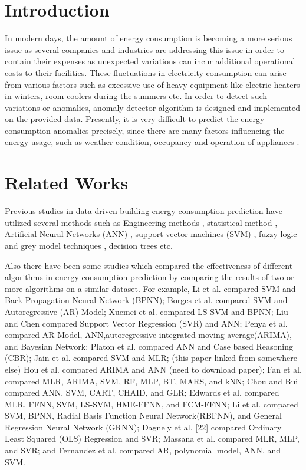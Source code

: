 \documentclass[conference]{IEEEtran}
\begin{document}
\section{Introduction}
In modern days, the amount of energy consumption is becoming a more serious issue as several companies and industries are addressing this issue in order to contain their expenses as unexpected variations can incur additional operational costs to their facilities. These fluctuations in electricity consumption can arise from various factors such as excessive use of heavy equipment like electric heaters in winters, room coolers during the summers etc. In order to detect such variations or anomalies, anomaly detector algorithm is designed and implemented on the provided data.
Presently, it is very difficult to predict the energy consumption anomalies precisely, since there are many factors influencing the energy usage, such as weather condition,  occupancy \cite{bb1} and operation of appliances \cite{bb2,bb3}. 

\section{Related Works}

Previous studies in data-driven building energy consumption prediction have utilized several methods such as Engineering methods \cite{bb4}, statistical method \cite{bb5}, Artificial Neural Networks (ANN) \cite{bb6,bb7}, support vector machines (SVM) \cite{bb8}, fuzzy logic and grey model techniques \cite{bb9}, decision trees \cite{bb10} etc. 

Also there have been some studies which compared the effectiveness of different algorithms in energy consumption prediction by comparing the results of two or more algorithms on a similar dataset. For example, Li et al. \cite{bb8} compared SVM and Back Propagation Neural Network (BPNN); Borges et al. \cite{bb11} compared SVM and Autoregressive (AR) Model; Xuemei et al. \cite{bb12}  compared LS-SVM and BPNN; Liu and Chen \cite{bb13}  compared Support Vector Regression (SVR) and ANN; Penya et al. \cite{bb14}  compared AR Model, ANN,autoregressive integrated moving average(ARIMA), and Bayesian Network; Platon et al. \cite{bb15}  compared ANN and Case based Reasoning (CBR); Jain et al. \cite{bb16} compared SVM and MLR; (this paper linked from somewhere else) Hou et al. \cite{bb17}  compared ARIMA and ANN (need to download paper);  Fan et al. \cite{bb18}  compared MLR, ARIMA, SVM, RF, MLP, BT, MARS, and kNN; Chou and Bui \cite{bb19}  compared ANN, SVM, CART, CHAID, and GLR; Edwards et al. \cite{bb20}  compared MLR, FFNN, SVM, LS-SVM, HME-FFNN, and FCM-FFNN; Li et al. \cite{bb21,bb22} compared SVM, BPNN, Radial Basis Function Neural Network(RBFNN), and General Regression Neural Network (GRNN); Dagnely et al. \cite{bb23} [22] compared Ordinary Least Squared (OLS) Regression and SVR; Massana et al. \cite{bb24} compared MLR, MLP, and SVR; and Fernandez et al. \cite{bb25}  compared AR, polynomial model, ANN, and SVM.
\end{document}

